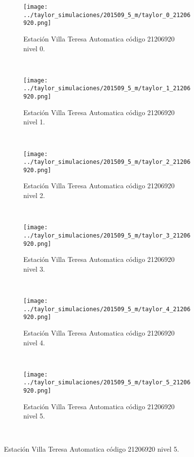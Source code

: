 \begin{figure}

\begin{subfigure}[normla]{0.4\textwidth}
\caption{Estación Villa Teresa Automatica  código 21206920 nivel 0.}
\texttt{[image: ../taylor\_simulaciones/201509\_5\_m/taylor\_0\_21206920.png]}
\end{subfigure}
~
\begin{subfigure}[normla]{0.4\textwidth}
\caption{Estación Villa Teresa Automatica  código 21206920 nivel 1.}
\texttt{[image: ../taylor\_simulaciones/201509\_5\_m/taylor\_1\_21206920.png]}
\end{subfigure}
~
\begin{subfigure}[normla]{0.4\textwidth}
\caption{Estación Villa Teresa Automatica  código 21206920 nivel 2.}
\texttt{[image: ../taylor\_simulaciones/201509\_5\_m/taylor\_2\_21206920.png]}
\end{subfigure}
~
\begin{subfigure}[normla]{0.4\textwidth}
\caption{Estación Villa Teresa Automatica  código 21206920 nivel 3.}
\texttt{[image: ../taylor\_simulaciones/201509\_5\_m/taylor\_3\_21206920.png]}
\end{subfigure}
~
\begin{subfigure}[normla]{0.4\textwidth}
\caption{Estación Villa Teresa Automatica  código 21206920 nivel 4.}
\texttt{[image: ../taylor\_simulaciones/201509\_5\_m/taylor\_4\_21206920.png]}
\end{subfigure}
~
\begin{subfigure}[normla]{0.4\textwidth}
\caption{Estación Villa Teresa Automatica  código 21206920 nivel 5.}
\texttt{[image: ../taylor\_simulaciones/201509\_5\_m/taylor\_5\_21206920.png]}
\end{subfigure}
~
\end{figure}
           
